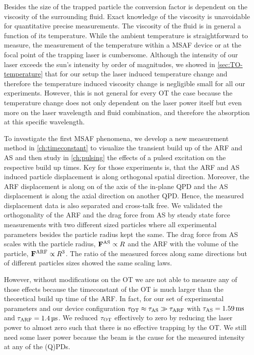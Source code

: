 Besides the size of the trapped particle the conversion factor is dependent on 
the viscosity of the surrounding fluid. Exact knowledge of the viscosity is 
unavoidable for quantitative precise measurements. The viscosity of the fluid 
is in general a function of its temperature. While the ambient temperature is 
straightforward to measure, the measurement of the temperature within a MSAF 
device or at the focal point of the trapping laser is cumbersome. Although the 
intensity of our laser exceeds the sun's intensity by order of magnitudes, we 
showed in \cref{sec:TO-temperature} that for our setup the laser induced 
temperature change and therefore the temperature induced viscosity change is 
negligible small for all our experiments. However, this is not general for 
every OT the case because the temperature change does not only dependent on the 
laser power itself but even more on the laser wavelength and fluid combination, 
and therefore the absorption at this specific wavelength.

To investigate the first MSAF phenomena, we develop a new measurement method in 
\cref{ch:timeconstant} to visualize the transient build up of the ARF and AS 
and then study in \cref{ch:pulsing} the effects of a pulsed excitation on the 
respective build up times. Key for those experiments is, that the ARF and AS 
induced particle displacement is along orthogonal spatial direction. Moreover, 
the ARF displacement is along on of the axis of the in-plane QPD and the AS 
displacement is along the axial direction on another QPD. Hence, the measured 
displacement data is also separated and cross-talk free. We validated the 
orthogonality of the ARF and the drag force from AS by steady state force 
measurements with two different sized particles where all experimental 
parameters besides the particle radius kept the same. The drag force from AS 
scales with the particle radius, $\vb{F}^{\mathrm{AS}}\propto R$ and the ARF with the volume of 
the particle, $\vb{F}^{\mathrm{ARF}}\propto R^{3}$. The ratio of the measured forces along same 
directions but of different particles sizes showed the same scaling laws. 

However, without modifications on the OT we are not able to measure any of 
those effects because the timeconstant of the OT is much larger than the 
theoretical build up time of the ARF. In fact, for our set of experimental 
parameters and our device configuration $\tau_{\mathrm{OT}} \approx \tau_{\mathrm{AS}} \gg \tau_{\mathrm{ARF}}$ with 
$\tas = \SI{1.59}{\ms}$ and $\tarf = \SI{1.4}{\us}$. We reduced $\tau_{\mathrm{OT}}$ 
effectively to zero by reducing the laser power to almost zero such that there 
is no effective trapping by the OT. We still need some laser power because the 
beam is the cause for the measured intensity at any of the (Q)PDs.

